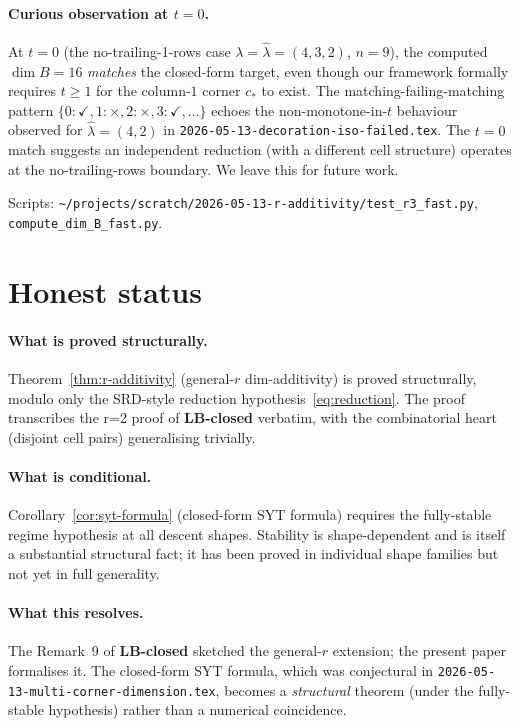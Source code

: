\documentclass[11pt]{article}
\theoremstyle{definition}
\begin{document}
\paragraph{Curious observation at $t = 0$.}
At $t = 0$ (the no-trailing-1-rows case $\lambda = \hat\lambda = (4, 3, 2)$,
$n = 9$), the computed $\dim B = 16$ \emph{matches} the closed-form
target, even though our framework formally requires $t \ge 1$ for the
column-$1$ corner $c_*$ to exist. The matching-failing-matching
pattern $\{0 : \checkmark, 1 : \times, 2 : \times, 3 : \checkmark, \ldots\}$
echoes the non-monotone-in-$t$ behaviour observed for $\widehat\lambda = (4, 2)$
in \texttt{2026-05-13-decoration-iso-failed.tex}. The $t = 0$ match
suggests an independent reduction (with a different cell structure)
operates at the no-trailing-rows boundary. We leave this for future
work.

Scripts: \texttt{\textasciitilde/projects/scratch/2026-05-13-r-additivity/test\_r3\_fast.py},
\texttt{compute\_dim\_B\_fast.py}.

\section{Honest status}\label{sec:status}

\paragraph{What is proved structurally.}
Theorem~\ref{thm:r-additivity} (general-$r$ dim-additivity) is proved
structurally, modulo only the SRD-style reduction
hypothesis~\eqref{eq:reduction}. The proof transcribes the r=2 proof
of \textbf{LB-closed} verbatim, with the combinatorial heart
(disjoint cell pairs) generalising trivially.

\paragraph{What is conditional.}
Corollary~\ref{cor:syt-formula} (closed-form SYT formula) requires
the fully-stable regime hypothesis at all descent shapes. Stability
is shape-dependent and is itself a substantial structural fact; it
has been proved in individual shape families but not yet in full
generality.

\paragraph{What this resolves.}
The Remark~9 of \textbf{LB-closed} sketched the general-$r$
extension; the present paper formalises it. The closed-form SYT
formula, which was conjectural in
\texttt{2026-05-13-multi-corner-dimension.tex}, becomes a
\emph{structural} theorem (under the fully-stable hypothesis) rather
than a numerical coincidence.
\end{document}
